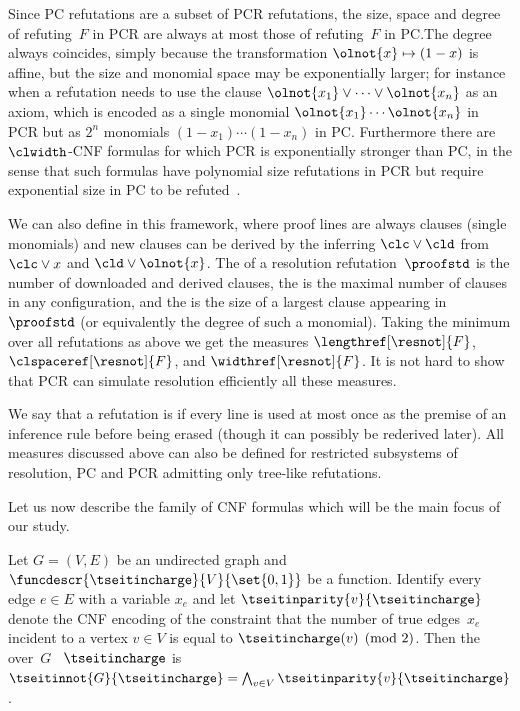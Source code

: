 \documentclass{toc}
\begin{document}
Since PC refutations are a subset of PCR refutations, the size, space
and degree of refuting~$F$ in PCR are always at most those of
refuting~$F$ in PC.\@ The degree always coincides, simply because the
%
%
transformation $\olnot{x} \mapsto (1-x)$ is affine, 
but the size and
monomial space may be exponentially larger; for instance when
a refutation needs to use the clause
$\olnot{x_1}\lor\cdots\lor\olnot{x_n}$ as an axiom, which is encoded
as a single monomial $\olnot{x_1}\cdots\olnot{x_n}$ in PCR but as
$2^n$ monomials $(1-x_1)\cdots(1-x_n)$ in PC.
%
Furthermore there are $\clwidth$-CNF formulas for which PCR is
exponentially stronger than PC, in the sense that such formulas have
polynomial size refutations in PCR but require exponential size in PC to be
%
refuted~\cite{dRLNS21Negative}.

We can also define  in this framework, 
where proof lines are always clauses (\ieComma single monomials)
and new clauses can be derived by the 
inferring
$\clc \lor \cld$
from
$\clc \lor x$
and
$\cld \lor \olnot{x}$.
The  of a resolution refutation~$\proofstd$ is the number
of downloaded and derived clauses, the  is the
maximal number of clauses in any configuration, and the  
 is the size of a largest clause appearing
in~$\proofstd$ (or equivalently the degree of such a monomial). 
Taking the minimum over all refutations as above we
get the measures
$\lengthref[\resnot]{F}$,
$\clspaceref[\resnot]{F}$,
and
$\widthref[\resnot]{F}$.
It is not hard to show that PCR can simulate resolution efficiently
\wrt all these measures.

We say that a refutation is  if every line is
used at most once as  the premise of an inference rule before being
erased (though it can possibly be rederived later). All 
measures
discussed above can also be defined for restricted subsystems of
resolution, PC and PCR admitting only tree-like refutations.

Let us now
describe
%
the family of CNF formulas 
which will be the main focus
of our study.

\begin{definition}
  \label{def:tseitinmod2}
  Let $G = (V,E)$ be an undirected graph and 
  $\funcdescr{\tseitincharge}{V}{\set{0,1}}$ 
  be a function. 
  Identify every edge $e \in E$ with a variable $x_e$
  and  let
  $\tseitinparity{v}{\tseitincharge}$
  denote the CNF encoding
%
  of the constraint
  that the number of true edges~$x_e$ incident to a vertex $v \in V$
  is equal to $\tseitincharge(v) \pmod{2}$.
%
%
%
  Then the  over~$G$ \wrt{}~$\tseitincharge$
  is $\tseitinnot{G}{\tseitincharge}=\bigwedge_{v\in V}\tseitinparity{v}{\tseitincharge}$.
\end{definition}
\end{document}
